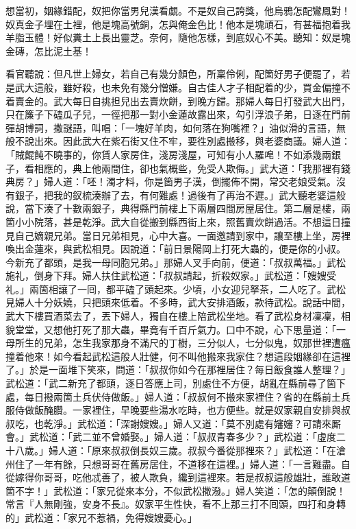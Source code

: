 \begin{myquote}
想當初，姻緣錯配，奴把你當男兒漢看覷。不是奴自己誇獎，他烏鴉怎配鸞鳳對！奴真金子埋在土裡，他是塊高號銅，怎與俺金色比！他本是塊頑石，有甚福抱着我羊脂玉體！好似糞土上長出靈芝。奈何，隨他怎樣，到底奴心不美。聽知：奴是塊金磚，怎比泥土基！
\end{myquote}

看官聽說：但凡世上婦女，若自己有幾分顏色，所稟伶俐，配箇好男子便罷了，若是武大這般，雖好殺，也未免有幾分憎嫌。{}自古佳人才子相配着的少，買金偏撞不着賣金的。武大每日自挑担兒出去賣炊餅，到晚方歸。那婦人每日打發武大出門，只在簾子下磕瓜子兒，{}一徑把那一對小金蓮故露出來，勾引浮浪子弟，日逐在門前彈胡博詞，撒謎語，叫唱：「一塊好羊肉，如何落在狗嘴裡？」油似滑的言語，無般不說出來。因此武大在紫石街又住不牢，要徃別處搬移，與老婆商議。婦人道：「賊餛飩不曉事的，你賃人家房住，淺房淺屋，可知有小人羅唣！不如添幾兩銀子，看相應的，典上他兩間住，卻也氣概些，免受人欺侮。」武大道：「我那裡有錢典房？」婦人道：「呸！濁才料，你是箇男子漢，倒擺佈不開，常交老娘受氣。沒有銀子，把我的釵梳湊辦了去，有何難處！過後有了再治不遲。」{}武大聽老婆這般說，當下湊了十數兩銀子，典得縣門前樓上下兩層四間房屋居住。第二層是樓，兩箇小小院落，甚是乾淨。武大自從搬到縣西街上來，照舊賣炊餅過活。不想這日撞見自己嫡親兄弟。當日兄弟相見，心中大喜。一面邀請到家中，讓至樓上坐，房裡喚出金蓮來，與武松相見。因說道：「前日景陽岡上打死大蟲的，便是你的小叔。{}今新充了都頭，是我一母同胞兄弟。」{}那婦人叉手向前，便道：「叔叔萬福。」武松施礼，倒身下拜。婦人扶住武松道：「叔叔請起，折殺奴家。」武松道：「嫂嫂受礼。」兩箇相讓了一囘，都平磕了頭起來。少頃，小女迎兒拏茶，二人吃了。武松見婦人十分妖嬈，只把頭來低着。{}不多時，武大安排酒飯，款待武松。說話中間，武大下樓買酒菜去了，丟下婦人，獨自在樓上陪武松坐地。看了武松身材凜凜，相貌堂堂，{}又想他打死了那大蟲，畢竟有千百斤氣力。{}口中不說，心下思量道：「一母所生的兄弟，怎生我家那身不滿尺的丁樹，三分似人，七分似鬼，奴那世裡遭瘟撞着他來！如今看起武松這般人壯健，何不叫他搬來我家住？想這段姻緣卻在這裡了。」{}於是一面堆下笑來，問道：「叔叔你如今在那裡居住？每日飯食誰人整理？」武松道：「武二新充了都頭，逐日答應上司，別處住不方便，胡亂在縣前尋了箇下處，每日撥兩箇土兵伏侍做飯。」婦人道：「叔叔何不搬來家裡住？省的在縣前土兵服侍做飯醃臢。一家裡住，早晚要些湯水吃時，也方便些。就是奴家親自安排與叔叔吃，也乾淨。」武松道：「深謝嫂嫂。」婦人又道：「莫不別處有嬸嬸？{}可請來厮會。」武松道：「武二並不曾婚娶。」婦人道：「叔叔青春多少？」武松道：「虛度二十八歲。」婦人道：「原來叔叔倒長奴三歲。叔叔今番從那裡來？」武松道：「在滄州住了一年有餘，只想哥哥在舊房居住，不道移在這裡。」婦人道：「一言難盡。自從嫁得你哥哥，吃他忒善了，被人欺負，纔到這裡來。若是叔叔這般雄壯，{}誰敢道箇不字！」武松道：「家兄從來本分，不似武松撒潑。」{}婦人笑道：「怎的顛倒說！常言『人無剛強，安身不長』。奴家平生性快，看不上那三打不囘頭，四打和身轉的」武松道：「家兄不惹禍，免得嫂嫂憂心。」

